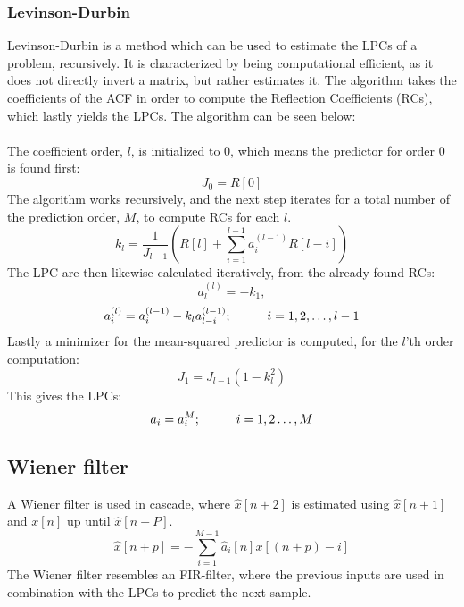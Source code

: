 \subsubsection{Levinson-Durbin}
Levinson-Durbin is a method which can be used to estimate the LPCs of a problem, recursively. It is characterized by being computational efficient, as it does not directly invert a matrix, but rather estimates it.
The algorithm takes the coefficients of the ACF in order to compute the Reflection Coefficients (RCs), which lastly yields the LPCs. The algorithm can be seen below:\\\\
The coefficient order, $l$, is initialized to 0, which means the predictor for order 0 is found first:
\begin{equation}\label{LDInit}
	J_0=R[0]
\end{equation}
The algorithm works recursively, and the next step iterates for a total number of the prediction order, $M$, to compute RCs for each $l$.
\begin{equation}\label{LDStep1}
	k_l=\frac{1}{J_{l-1}} \left ( R[l] + \sum_{i=1}^{l-1} a_i^{(l-1)}R[l-i]   \right) 
\end{equation}
The LPC are then likewise calculated iteratively, from the already found RCs: 
\begin{equation}\label{LDStep2_1}
	a_l^{(l)} = -k_1,
\end{equation}
\begin{equation}\label{LDStep2_2}
a_i^{(l)} = a_i^{(l-1)} - k_l a_{l-i}^{(l-1)} ; \hspace{10mm} i = 1,2,\dotsc,l-1
\end{equation}
Lastly a minimizer for the mean-squared predictor is computed, for the $l$'th order computation:
\begin{equation}\label{LDStep2}
	J_1 = J_{l-1} (1-k_l^2)
\end{equation}
This gives the LPCs:
\begin{equation}
	a_i = a_i^{M}; \hspace{10mm} i = 1,2 \dotsc , M
\end{equation}


\subsection{Wiener filter}
A Wiener filter is used in cascade, where $\hat{x}[n+2]$ is estimated using $\hat{x}[n+1]$ and $x[n]$ up until $\hat{x}[n+P]$. 
\begin{equation}\label{eq:AppPredictor}
\hat{x}[n+p] =- \sum^{M-1}_{i=1}\hat{a}_i[n]x[(n+p)-i]
\end{equation}
The Wiener filter resembles an FIR-filter, where the previous inputs are used in combination with the LPCs to predict the next sample. 

